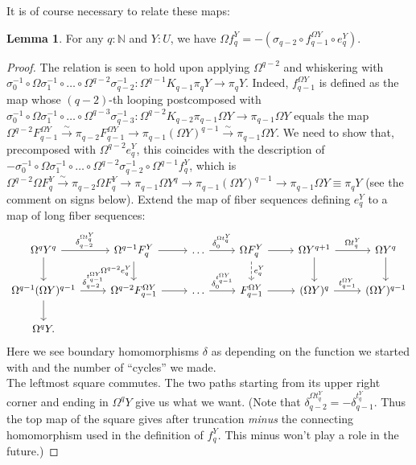 \documentclass{amsart}
\theoremstyle{definition}
\newtheorem{lem}[theorem]{Lemma}
\begin{document}
It is of course necessary to relate these maps:
\begin{lem}\label{le:twoangles}
    For any $q: \mathbb{N}$ and $Y:U$,
    we have
    $\Omega f^Y_q = - (\sigma_{q-2} \circ f^{\Omega Y}_{q-1} \circ e^Y_q).$
\end{lem}
\begin{proof}
    The relation is seen to hold upon applying $\Omega^{q-2}$ and whiskering with $\sigma_0^{-1} \circ \Omega \sigma_1^{-1} \circ \ldots \circ \Omega^{q-2} \sigma_{q-2}^{-1}: \Omega^{q-1}K_{q-1}\pi_qY \to \pi_q Y$.
    Indeed, $f^{\Omega Y}_{q-1}$ is defined as the map whose $(q-2)$-th looping postcomposed with $\sigma_0^{-1} \circ \Omega \sigma_1^{-1} \circ \ldots \circ \Omega^{q-3} \sigma_{q-3}^{-1}: \Omega^{q-2}K_{q-2}\pi_{q-1} \Omega Y \to \pi_{q-1} \Omega Y$ equals the map $\Omega^{q-2}F_{q-1}^{\Omega Y} \xrightarrow{\sim} \pi_{q-2}F_{q-1}^{\Omega Y} \to \pi_{q-1}(\Omega Y)^{q-1} \xrightarrow{\sim} \pi_{q-1}\Omega Y$. We need to show that, precomposed with $\Omega^{q-2} e^Y_q$, this coincides with the description of $- \sigma_0^{-1} \circ \Omega \sigma_1^{-1} \circ \ldots \circ \Omega^{q-2} \sigma_{q-2}^{-1} \circ \Omega^{q-1} f^Y_q$, which is $\Omega^{q-2} \Omega F^Y_q \xrightarrow{\sim} \pi_{q-2}\Omega F^Y_q \to \pi_{q-1} \Omega Y^{q} \to \pi_{q-1}(\Omega Y)^{q-1} \to \pi_{q-1}\Omega Y \equiv \pi_{q}Y$ (see the comment on signs below).
    Extend the map of fiber sequences defining $e^Y_q$ to a map of long fiber sequences:
    \[\begin{tikzcd}
    	{\Omega^{q} Y^{q}} & {\Omega^{q-1} F^{Y}_q} & \ldots & {\Omega F^{Y}_q} & {\Omega Y^{q+1}} & {\Omega Y^{q}} \\
    	{\Omega^{q-1}(\Omega Y)^{q-1}} & {\Omega^{q-2} F^{\Omega Y}_{q-1}} & \ldots & {F^{\Omega Y}_{q-1}} & {(\Omega Y)^q} & {(\Omega Y)^{q-1}} \\
    	{\Omega^{q} Y.}
    	\arrow["{\delta_{q-2}^{\Omega t_q^Y}}", from=1-1, to=1-2]
    	\arrow[from=1-1, to=2-1]
    	\arrow[from=1-2, to=1-3]
    	\arrow["{\Omega^{q-2} e^Y_{q}}"', from=1-2, to=2-2]
    	\arrow["{\delta_0^{\Omega t_q^Y}}", from=1-3, to=1-4]
    	\arrow[from=1-4, to=1-5]
    	\arrow["{e_q^Y}", dashed, from=1-4, to=2-4]
    	\arrow["{\Omega t_q^Y}", from=1-5, to=1-6]
    	\arrow[from=1-5, to=2-5]
    	\arrow[from=1-6, to=2-6]
    	\arrow["{\delta_{q-2}^{t_{q-1}^{\Omega Y}}}", from=2-1, to=2-2]
    	\arrow[from=2-1, to=3-1]
    	\arrow[from=2-2, to=2-3]
    	\arrow["{\delta_{0}^{t_{q-1}^{\Omega Y}}}", from=2-3, to=2-4]
    	\arrow[from=2-4, to=2-5]
    	\arrow["{t_{q-1}^{\Omega Y}}", from=2-5, to=2-6]
    \end{tikzcd}\]
    Here we see boundary homomorphisms $\delta$ as depending on the function we started with and the number of ``cycles'' we made.
    \\
    The leftmost square commutes. The two paths starting from its upper right corner and ending in $\Omega^q Y$ give us what we want.
    (Note that $\delta_{q-2}^{\Omega t_q^{Y}} = -\delta_{q-1}^{t_{q}^{Y}}$. Thus the top map of the square gives after truncation \textit{minus}
    the connecting homomorphism used in the definition of $f^Y_q$. This minus won't play a role in the future.)
\end{proof}
\end{document}

